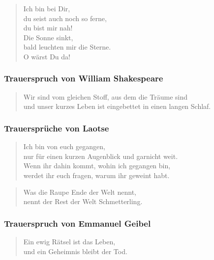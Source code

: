 \documentclass[ngerman,a4paper,11pt]{scrreprt}
\begin{document}
\begin{verse}
Ich bin bei Dir, \\
du seist auch noch so ferne, \\
du bist mir nah! \\
Die Sonne sinkt, \\
bald leuchten mir die Sterne. \\
O wärst Du da! \\
\end{verse}

\subsubsection*{Trauerspruch von William Shakespeare}
\label{sec-1-1-1-3-14}

\begin{verse}
Wir sind vom gleichen Stoff, aus dem die Träume sind \\
und unser kurzes Leben ist eingebettet in einen langen Schlaf. \\
\end{verse}

\subsubsection*{Trauersprüche von Laotse}
\label{sec-1-1-1-3-15}

\begin{verse}
Ich bin von euch gegangen, \\
nur für einen kurzen Augenblick und garnicht weit. \\
Wenn ihr dahin kommt, wohin ich gegangen bin, \\
werdet ihr euch fragen, warum ihr geweint habt. \\
\end{verse}

\begin{verse}
Was die Raupe Ende der Welt nennt, \\
nennt der Rest der Welt Schmetterling. \\
\end{verse}

\subsubsection*{Trauerspruch von Emmanuel Geibel}
\label{sec-1-1-1-3-16}

\begin{verse}
Ein ewig Rätsel ist das Leben, \\
und ein Geheimnis bleibt der Tod. \\
\end{verse}
\end{document}
